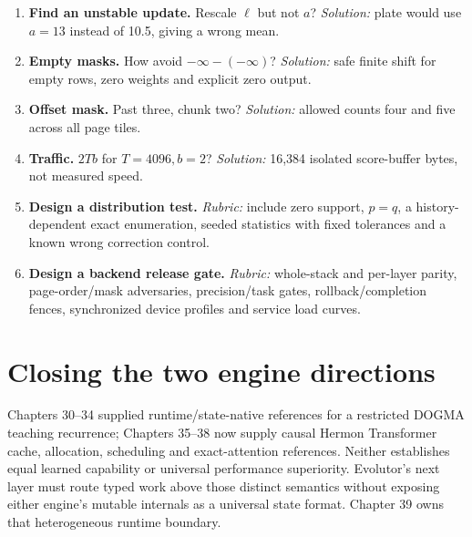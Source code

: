 \begin{enumerate}
\emph{Solution:} $(\log4,1.75,10.5)$; ratio six.
\item \textbf{Find an unstable update.} Rescale $\ell$ but not $a$?
\emph{Solution:} plate would use $a=13$ instead of 10.5, giving a wrong mean.
\item \textbf{Empty masks.} How avoid $-\infty-(-\infty)$?
\emph{Solution:} safe finite shift for empty rows, zero weights and explicit zero output.
\item \textbf{Offset mask.} Past three, chunk two?
\emph{Solution:} allowed counts four and five across all page tiles.
\item \textbf{Traffic.} $2Tb$ for $T=4096,b=2$?
\emph{Solution:} 16,384 isolated score-buffer bytes, not measured speed.
\item \textbf{Design a distribution test.} \emph{Rubric:} include zero
support, $p=q$, a history-dependent exact enumeration, seeded statistics
with fixed tolerances and a known wrong correction control.
\item \textbf{Design a backend release gate.} \emph{Rubric:} whole-stack
and per-layer parity, page-order/mask adversaries, precision/task gates,
rollback/completion fences, synchronized device profiles and service load curves.
\end{enumerate}

\section{Closing the two engine directions}
Chapters 30--34 supplied runtime/state-native references for a restricted
DOGMA teaching recurrence; Chapters 35--38 now supply causal Hermon
Transformer cache, allocation, scheduling and exact-attention references.
Neither establishes equal learned capability or universal performance
superiority. Evolutor's next layer must route typed work above those distinct
semantics without exposing either engine's mutable internals as a universal
state format. Chapter 39 owns that heterogeneous runtime boundary.
